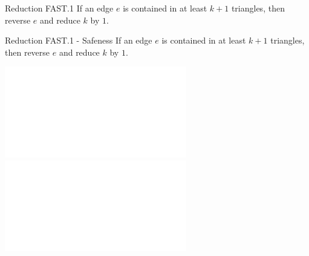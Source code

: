 \documentclass{beamer}
\begin{document}
	\begin{frame}[fragile]{Reduction FAST.1}
		If an edge \(e\) is contained in at least \(k+1\) triangles, then reverse \(e\) and reduce \(k\) by \(1\). \newline 
		
		\begin{center}
		\end{center}
	\end{frame}
	
	\begin{frame}[fragile]{Reduction FAST.1 - Safeness}
		If an edge \(e\) is contained in at least \(k+1\) triangles, then reverse \(e\) and reduce \(k\) by \(1\). 
		\begin{center}
			\includegraphics<1>[height=0.6\paperheight]{images/FAST_1/FAST1_Safeness1.pdf}
			\includegraphics<2>[height=0.6\paperheight]{images/FAST_1/FAST1_Safeness2.pdf}
		\end{center}
	\end{frame}
	
\end{document}
